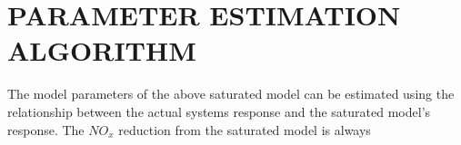 \section{PARAMETER ESTIMATION ALGORITHM}
The model parameters of the above saturated model can be estimated using the relationship between the actual systems response and the saturated model's response. The $NO_x$ reduction from the saturated model is always
